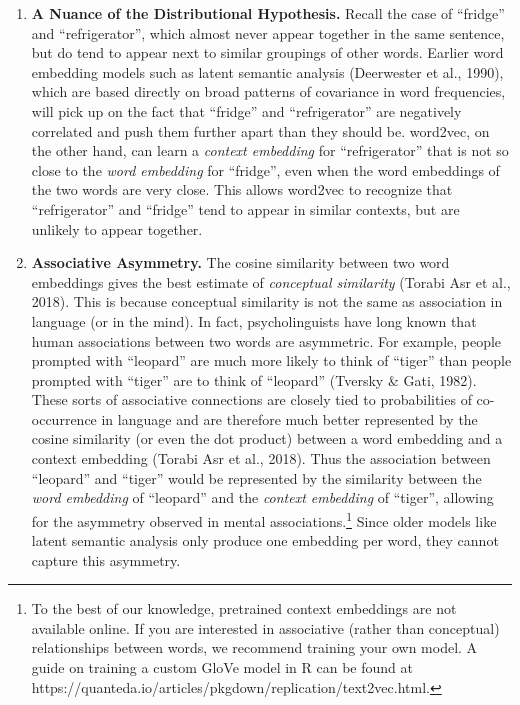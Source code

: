 \documentclass[
  man,
  floatsintext,
  longtable,
  nolmodern,
  notxfonts,
  notimes,
  colorlinks=true,linkcolor=blue,citecolor=blue,urlcolor=blue]{apa7}
\providecommand{\tightlist}{%
  \setlength{\itemsep}{0pt}\setlength{\parskip}{0pt}}
\begin{document}
\begin{enumerate}
\def\labelenumi{\arabic{enumi}.}
\tightlist
\item
  \textbf{A Nuance of the Distributional Hypothesis.} Recall the case of
  ``fridge'' and ``refrigerator'', which almost never appear together in
  the same sentence, but do tend to appear next to similar groupings of
  other words. Earlier word embedding models such as latent semantic
  analysis (Deerwester et al., 1990), which are based directly on broad
  patterns of covariance in word frequencies, will pick up on the fact
  that ``fridge'' and ``refrigerator'' are negatively correlated and
  push them further apart than they should be. word2vec, on the other
  hand, can learn a \emph{context embedding} for ``refrigerator'' that
  is not so close to the \emph{word embedding} for ``fridge'', even when
  the word embeddings of the two words are very close. This allows
  word2vec to recognize that ``refrigerator'' and ``fridge'' tend to
  appear in similar contexts, but are unlikely to appear together.
\item
  \textbf{Associative Asymmetry.} The cosine similarity between two word
  embeddings gives the best estimate of \emph{conceptual similarity}
  (Torabi Asr et al., 2018). This is because conceptual similarity is
  not the same as association in language (or in the mind). In fact,
  psycholinguists have long known that human associations between two
  words are asymmetric. For example, people prompted with ``leopard''
  are much more likely to think of ``tiger'' than people prompted with
  ``tiger'' are to think of ``leopard'' (Tversky \& Gati, 1982). These
  sorts of associative connections are closely tied to probabilities of
  co-occurrence in language and are therefore much better represented by
  the cosine similarity (or even the dot product) between a word
  embedding and a context embedding (Torabi Asr et al., 2018). Thus the
  association between ``leopard'' and ``tiger'' would be represented by
  the similarity between the \emph{word embedding} of ``leopard'' and
  the \emph{context embedding} of ``tiger'', allowing for the asymmetry
  observed in mental associations.\footnote{To the best of our
    knowledge, pretrained context embeddings are not available online.
    If you are interested in associative (rather than conceptual)
    relationships between words, we recommend training your own model. A
    guide on training a custom GloVe model in R can be found at
    https://quanteda.io/articles/pkgdown/replication/text2vec.html.}
  Since older models like latent semantic analysis only produce one
  embedding per word, they cannot capture this asymmetry.
\end{enumerate}
\end{document}
